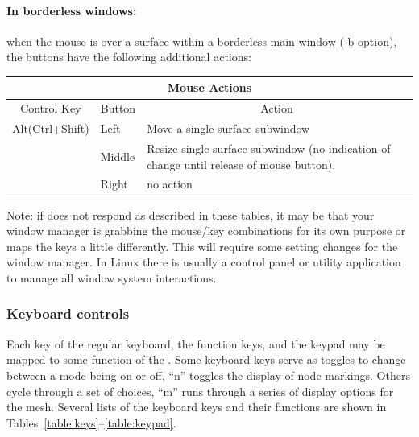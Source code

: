 \paragraph{In borderless windows: } when the mouse is over a 
surface within a borderless main window (-b option), the buttons have the
following additional actions: 
\begin{center}
  \begin{tabular}{|l|l|p{3in}|} \hline
    \multicolumn{3}{|c|}{Mouse Actions}\\ \hline
    \multicolumn{1}{|c|}{Control Key} & 
    \multicolumn{1}{|c|}{Button} & 
    \multicolumn{1}{|c|}{Action}\\ \hline
    Alt(Ctrl+Shift)   & Left & Move a single surface subwindow \\ 
      & Middle & Resize single surface subwindow (no indication of change
    until release of mouse button).\\ 
      & Right & no action \\ \hline
  \end{tabular}
\end{center}

Note: if \map{} does not respond as described in these tables, it may be
that your window manager is grabbing the mouse/key combinations for its own
purpose or maps the keys a little differently.  This will require some
setting changes for the window manager.  In Linux there is usually a
control panel or utility application to manage all window system
interactions.


\subsubsection{Keyboard controls}
\label{sec:control-keys} 

Each key of the regular keyboard, the function keys, and the keypad may be
mapped to some function of the \map{}.  Some keyboard keys serve as toggles
to change between a mode being on or off, \eg{} ``n'' toggles the display
of node markings.  Others cycle through a set of choices, \eg{} ``m'' runs
through a series of display options for the mesh.  Several lists of the
keyboard keys and their functions are shown in
Tables~\ref{table:keys}--\ref{table:keypad}.

